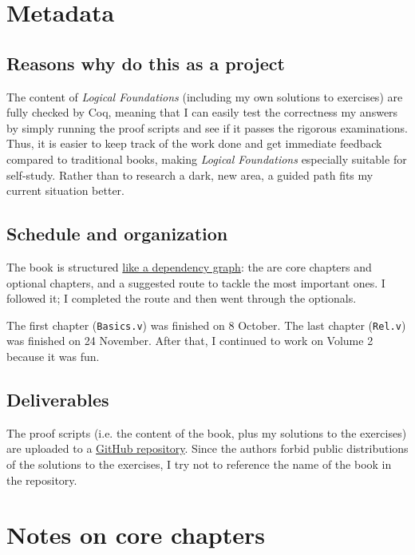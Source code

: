 \documentclass[screen,sigplan]{acmart}\settopmatter{printfolios=true,printccs=false,printacmref=false}
\begin{document}
\section{Metadata}

\subsection{Reasons why do this as a project}

The content of \emph{Logical Foundations} (including my own solutions to exercises) are fully checked
by Coq, meaning that I can easily test the correctness my answers by simply running the proof scripts
and see if it passes the rigorous examinations. Thus, it is easier to keep track of the work done and get immediate feedback compared to
traditional books, making \emph{Logical Foundations} especially suitable for self-study.
Rather than to research a dark, new area, a guided path fits my current situation better.

\subsection{Schedule and organization}
The book is structured \href{https://softwarefoundations.cis.upenn.edu/lf-current/deps.html}{like a dependency graph}:
the are core chapters and optional chapters,
and a suggested route to tackle the most important ones. I followed it; I completed the route
and then went through the optionals.

The first chapter (\texttt{Basics.v}) was finished on 8 October. The last chapter (\texttt{Rel.v}) 
was finished on 24 November. After that, I continued to work on Volume 2 because it was fun.

\subsection{Deliverables}
The proof scripts (i.e. the content of the book, plus my solutions to the exercises)
are uploaded to a \href{https://github.com/nerrons/lf-works}{GitHub repository}. Since
the authors forbid public distributions of the solutions to the exercises, I try not to reference
the name of the book in the repository.



\section{Notes on core chapters}
\end{document}
